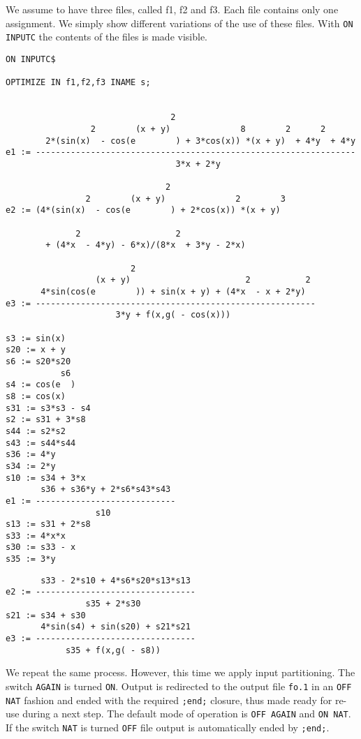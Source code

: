 We assume to have three files, called f1, f2 and f3. Each file contains only
one assignment. We simply show different variations of the use of these files.
With {\tt ON INPUTC} the contents of the files is made visible.
{\small
\begin{verbatim}
ON INPUTC$

OPTIMIZE IN f1,f2,f3 INAME s;


                                 2
                 2        (x + y)              8        2      2
        2*(sin(x)  - cos(e        ) + 3*cos(x)) *(x + y)  + 4*y  + 4*y
e1 := ----------------------------------------------------------------
                                  3*x + 2*y

                                2
                2        (x + y)              2        3
e2 := (4*(sin(x)  - cos(e        ) + 2*cos(x)) *(x + y)

              2                   2
        + (4*x  - 4*y) - 6*x)/(8*x  + 3*y - 2*x)

                         2
                  (x + y)                       2           2
       4*sin(cos(e        )) + sin(x + y) + (4*x  - x + 2*y)
e3 := --------------------------------------------------------
                      3*y + f(x,g( - cos(x)))

s3 := sin(x)
s20 := x + y
s6 := s20*s20
           s6
s4 := cos(e  )
s8 := cos(x)
s31 := s3*s3 - s4
s2 := s31 + 3*s8
s44 := s2*s2
s43 := s44*s44
s36 := 4*y
s34 := 2*y
s10 := s34 + 3*x
       s36 + s36*y + 2*s6*s43*s43
e1 := ----------------------------
                  s10
s13 := s31 + 2*s8
s33 := 4*x*x
s30 := s33 - x
s35 := 3*y
\end{verbatim}}
\newpage
{\small
\begin{verbatim}
       s33 - 2*s10 + 4*s6*s20*s13*s13
e2 := --------------------------------
                s35 + 2*s30
s21 := s34 + s30
       4*sin(s4) + sin(s20) + s21*s21
e3 := --------------------------------
            s35 + f(x,g( - s8))

\end{verbatim}}

We repeat the same process. However, this time we apply input partitioning.
The switch {\tt AGAIN} is turned {\tt ON}. Output is redirected to the
output file {\tt fo.1} in an {\tt OFF NAT} fashion and ended with the required
{\tt ;end;} closure, thus made ready for re-use during a next step.
The default mode of operation is {\tt OFF AGAIN} and {\tt ON NAT}. If the
switch {\tt NAT} is turned {\tt OFF} file output is automatically ended
by {\tt ;end;}.

